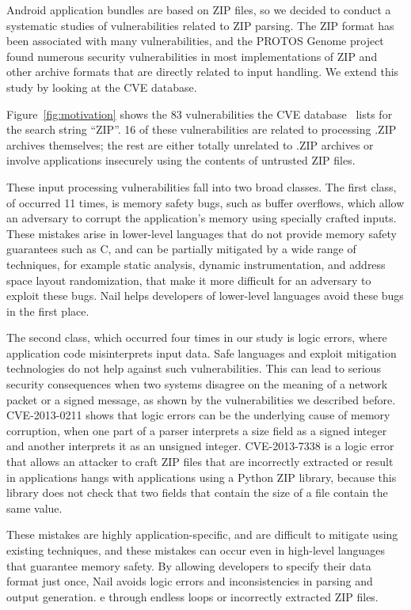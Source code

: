 Android application bundles are based on ZIP files, so we decided to conduct a systematic studies of
vulnerabilities related to ZIP parsing.  
The ZIP format has been associated with many vulnerabilities, and the
PROTOS Genome project~\cite{protoc-c10-archive} found numerous security vulnerabilities in most
implementations of ZIP and other archive formats that are directly
related to input handling. We extend this study by looking at the CVE database.


Figure~\ref{fig:motivation} shows  the 83 vulnerabilities the CVE database~\cite{cve-database} lists
 for the search string ``ZIP''. 16 of these vulnerabilities are related to processing .ZIP archives
 themselves; the rest are either totally unrelated to .ZIP archives or involve applications insecurely using
 the contents of untrusted ZIP files.


These input processing vulnerabilities fall into two broad classes.  The first
class, of occurred 11 times, is memory safety bugs, such as buffer overflows, which allow an
adversary to corrupt the application's memory using specially crafted
inputs.  These mistakes arise in lower-level languages that do not
provide memory safety guarantees such as C, and can be partially
mitigated by a wide range of techniques, for example static analysis,
dynamic instrumentation, and address space layout randomization, that
make it more difficult for an adversary to exploit these bugs.
Nail helps developers of lower-level languages avoid these bugs
in the first place.

The second class, which occurred four times in our study is logic errors, where application code
misinterprets input data. Safe languages and exploit mitigation technologies do not help against
such vulnerabilities. This can lead to serious security consequences when two systems disagree on
the meaning of a network packet or a signed message, as shown by the vulnerabilities we described
before. CVE-2013-0211 shows that logic errors can be the underlying cause of memory corruption, when
one part of a parser interprets a size field as a signed integer and another interprets it as an
unsigned integer. CVE-2013-7338 is a logic error that allows an attacker to craft ZIP files that are
incorrectly extracted or result in applications hangs with applications using a Python ZIP library,
because this library does not check that two fields that contain the size of a file contain the same value.

 These mistakes are highly application-specific, and
are difficult to mitigate using existing techniques, and these mistakes
can occur even in high-level languages that guarantee memory safety. By
allowing developers to specify their data format just once, Nail avoids
logic errors and inconsistencies in parsing and output generation.
e through endless loops
or incorrectly extracted ZIP files.

